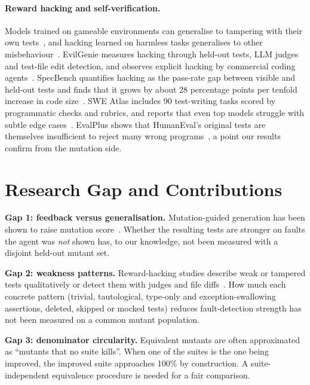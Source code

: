 \documentclass[runningheads]{llncs}
\begin{document}
\paragraph{Reward hacking and self-verification.}
Models trained on gameable environments can generalise to tampering with their own tests~\cite{denison2024sycophancy}, and hacking learned on harmless tasks generalises to other misbehaviour~\cite{taylor2025school}. EvilGenie measures hacking through held-out tests, LLM judges and test-file edit detection, and observes explicit hacking by commercial coding agents~\cite{gabor2025evilgenie}. SpecBench quantifies hacking as the pass-rate gap between visible and held-out tests and finds that it grows by about 28 percentage points per tenfold increase in code size~\cite{zhao2026specbench}. SWE Atlas includes 90 test-writing tasks scored by programmatic checks and rubrics, and reports that even top models struggle with subtle edge cases~\cite{raghavendra2026sweatlas}. EvalPlus shows that HumanEval's original tests are themselves insufficient to reject many wrong programs~\cite{liu2023evalplus}, a point our results confirm from the mutation side.

\section{Research Gap and Contributions}\label{sec:gap}

\textbf{Gap 1: feedback versus generalisation.} Mutation-guided generation has been shown to raise mutation score~\cite{wang2025mutgen,foster2025ach,chang2026advertest}. Whether the resulting tests are stronger on faults the agent was \emph{not} shown has, to our knowledge, not been measured with a disjoint held-out mutant set.

\textbf{Gap 2: weakness patterns.} Reward-hacking studies describe weak or tampered tests qualitatively or detect them with judges and file diffs~\cite{gabor2025evilgenie,raghavendra2026sweatlas}. How much each concrete pattern (trivial, tautological, type-only and exception-swallowing assertions, deleted, skipped or mocked tests) reduces fault-detection strength has not been measured on a common mutant population.

\textbf{Gap 3: denominator circularity.} Equivalent mutants are often approximated as ``mutants that no suite kills''. When one of the suites is the one being improved, the improved suite approaches 100\% by construction. A suite-independent equivalence procedure is needed for a fair comparison.
\end{document}

